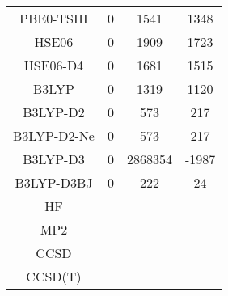 \begin{table}[ht]
\begin{tabular}{cccc}
PBE0-TSHI & 0 & 1541 & 1348 \\ 
HSE06 & 0 & 1909 & 1723 \\ 
HSE06-D4 & 0 & 1681 & 1515 \\ 
B3LYP & 0 & 1319 & 1120 \\ 
B3LYP-D2 & 0 & 573 & 217 \\ 
B3LYP-D2-Ne & 0 & 573 & 217 \\ 
B3LYP-D3 & 0 & 2868354 & -1987 \\ 
B3LYP-D3BJ & 0 & 222 & 24 \\ 
HF &  \\ 
MP2 &  \\ 
CCSD &  \\ 
CCSD(T) &  \\ 
\hline\hline
\end{tabular}
\end{table}